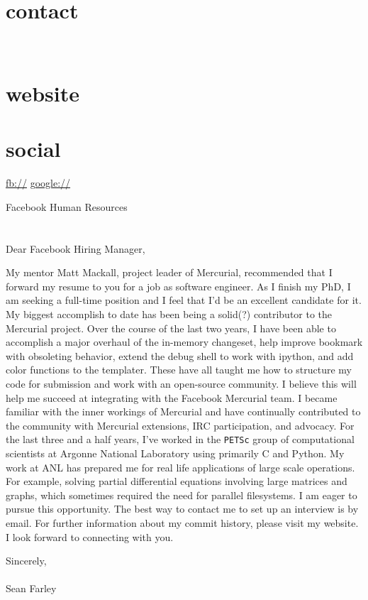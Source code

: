 \documentclass[]{fancy-cv}
\begin{document}

\begin{aside}
  \section{contact}
    \href{mailto:\myemail}{\myemail}
    ~
    \myphone
    ~
    \myaddress
    \mycity
  \section{website}
    \href{\mywebsite}{\mywebsite}
  \section{social}
    \href{http://facebook.com/\myfb}{fb://\myfb}
    \href{http://plug.google.com/\mygp}{google://\mygp}
\end{aside}

\vspace{.8em}
\large
Facebook Human Resources\\
\\
\\
Dear Facebook Hiring Manager,

My mentor Matt Mackall, project leader of Mercurial, recommended that I forward
my resume to you for a job as software engineer. As I finish my PhD, I am
seeking a full-time position and I feel that I'd be an excellent candidate for
it.
%
\newline\newline
%
My biggest accomplish to date has been being a solid(?) contributor to the
Mercurial project. Over the course of the last two years, I have been able to
accomplish a major overhaul of the in-memory changeset, help improve bookmark
with obsoleting behavior, extend the debug shell to work with ipython, and add
color functions to the templater. These have all taught me how to structure my
code for submission and work with an open-source community. I believe this will
help me succeed at integrating with the Facebook Mercurial team. I became
familiar with the inner workings of Mercurial and have continually contributed
to the community with Mercurial extensions, IRC participation, and advocacy.
%
\newline\newline
%
For the last three and a half years, I've worked in the \texttt{PETSc} group of
computational scientists at Argonne National Laboratory using primarily C and
Python. My work at ANL has prepared me for real life applications of large
scale operations. For example, solving partial differential equations involving
large matrices and graphs, which sometimes required the need for parallel
filesystems.
%
\newline\newline
%
I am eager to pursue this opportunity. The best way to contact me to set up an
interview is by email. For further information about my commit history, please
visit my website. I look forward to connecting with you.

\vspace{2em}
Sincerely,\\
\\
Sean Farley
\end{document}
